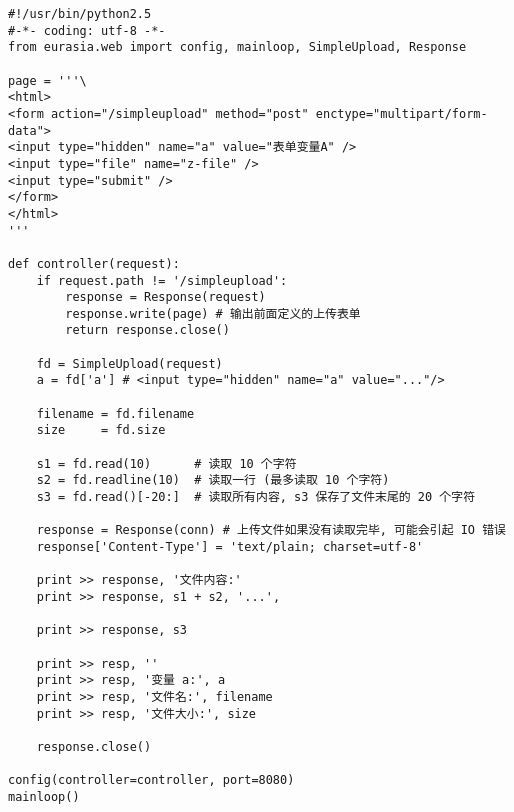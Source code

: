 \documentclass{manual}
\begin{document}
\begin{verbatim}
#!/usr/bin/python2.5
#-*- coding: utf-8 -*-
from eurasia.web import config, mainloop, SimpleUpload, Response

page = '''\
<html>
<form action="/simpleupload" method="post" enctype="multipart/form-data">
<input type="hidden" name="a" value="表单变量A" />
<input type="file" name="z-file" />
<input type="submit" />
</form>
</html>
'''

def controller(request):
	if request.path != '/simpleupload':
		response = Response(request)
		response.write(page) # 输出前面定义的上传表单
		return response.close()

	fd = SimpleUpload(request)
	a = fd['a'] # <input type="hidden" name="a" value="..."/>

	filename = fd.filename
	size     = fd.size

	s1 = fd.read(10)      # 读取 10 个字符
	s2 = fd.readline(10)  # 读取一行 (最多读取 10 个字符)
	s3 = fd.read()[-20:]  # 读取所有内容, s3 保存了文件末尾的 20 个字符

	response = Response(conn) # 上传文件如果没有读取完毕, 可能会引起 IO 错误 
	response['Content-Type'] = 'text/plain; charset=utf-8'

	print >> response, '文件内容:'
	print >> response, s1 + s2, '...',

	print >> response, s3

	print >> resp, ''
	print >> resp, '变量 a:', a
	print >> resp, '文件名:', filename
	print >> resp, '文件大小:', size

	response.close()

config(controller=controller, port=8080)
mainloop()
\end{verbatim}



\end{document}
